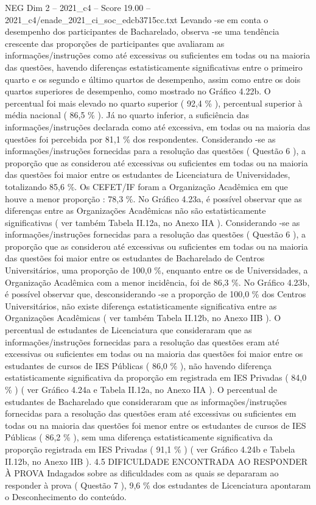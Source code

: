 \begin{textsample}{NEG Dim 2 – 2021\_c4 – Score 19.00 – 2021\_c4/enade\_2021\_ci\_soc\_edcb3715cc.txt}
Levando -se em conta o desempenho dos participantes de Bacharelado, observa -se uma tendência crescente das proporções de participantes que avaliaram as informações/instruções como até excessivas ou suficientes em todas ou na maioria das questões, havendo diferenças estatisticamente significativas entre o primeiro quarto e os segundo e último quartos de desempenho, assim como entre os dois quartos superiores de desempenho, como mostrado no Gráfico 4.22b.
O percentual foi mais elevado no quarto superior ( 92,4 \% ), percentual superior à média nacional ( 86,5 \% ).
Já no quarto inferior, a suficiência das informações/instruções declarada como até excessiva, em todas ou na maioria das questões foi percebida por 81,1 \% dos respondentes.
Considerando -se as informações/instruções fornecidas para a resolução das questões ( Questão 6 ), a proporção que as considerou até excessivas ou suficientes em todas ou na maioria das questões foi maior entre os estudantes de Licenciatura de Universidades, totalizando 85,6 \%.
Os CEFET/IF foram a Organização Acadêmica em que houve a menor proporção : 78,3 \%.
No Gráfico 4.23a, é possível observar que as diferenças entre as Organizações Acadêmicas não são estatisticamente significativas ( ver também Tabela II.12a, no Anexo IIA ).
Considerando -se as informações/instruções fornecidas para a resolução das questões ( Questão 6 ), a proporção que as considerou até excessivas ou suficientes em todas ou na maioria das questões foi maior entre os estudantes de Bacharelado de Centros Universitários, uma proporção de 100,0 \%, enquanto entre os de Universidades, a Organização Acadêmica com a menor incidência, foi de 86,3 \%.
No Gráfico 4.23b, é possível observar que, desconsiderando -se a proporção de 100,0 \% dos Centros Universitários, não existe diferença estatisticamente significativa entre as Organizações Acadêmicas ( ver também Tabela II.12b, no Anexo IIB ).
O percentual de estudantes de Licenciatura que consideraram que as informações/instruções fornecidas para a resolução das questões eram até excessivas ou suficientes em todas ou na maioria das questões foi maior entre os estudantes de cursos de IES Públicas ( 86,0 \% ), não havendo diferença estatisticamente significativa da proporção em registrada em IES Privadas ( 84,0 \% ) ( ver Gráfico 4.24a e Tabela II.12a, no Anexo IIA ).
O percentual de estudantes de Bacharelado que consideraram que as informações/instruções fornecidas para a resolução das questões eram até excessivas ou suficientes em todas ou na maioria das questões foi menor entre os estudantes de cursos de IES Públicas ( 86,2 \% ), sem uma diferença estatisticamente significativa da proporção registrada em IES Privadas ( 91,1 \% ) ( ver Gráfico 4.24b e Tabela II.12b, no Anexo IIB ). 4.5 DIFICULDADE ENCONTRADA AO RESPONDER À PROVA Indagados sobre as dificuldades com as quais se depararam ao responder à prova ( Questão 7 ), 9,6 \% dos estudantes de Licenciatura apontaram o Desconhecimento do conteúdo.

\end{textsample}
